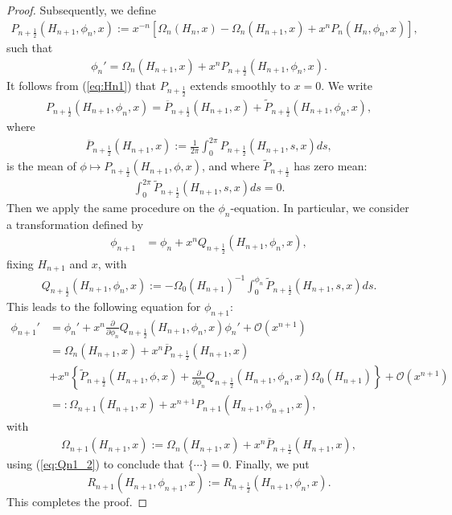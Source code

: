 \documentclass[reqno,12pt]{amsart}
\newcommand{\eqlab}[1]{\label{eq:#1}}
\renewcommand{\eqref}[1]{(\ref{eq:#1})}
\numberwithin{equation}{section}
\begin{document}
\begin{proof}
Subsequently, we define
\begin{align*}
 P_{n+\frac12}(H_{n+1},\phi_n,x):=x^{-n} \left[\Omega_n(H_n,x)-\Omega_n(H_{n+1},x) +x^{n} P_n(H_n,\phi_n,x)\right],
\end{align*}
such that 
\begin{align*}
 \phi_n' = \Omega_n(H_{n+1},x)+x^{n}P_{n+\frac12}(H_{n+1},\phi_n,x).
\end{align*}
 It follows from \eqref{Hn1} that $P_{n+\frac12}$ extends smoothly to $x=0$. We write 
 \begin{align*}
  P_{n+\frac12}(H_{n+1},\phi_n,x)  = \overline P_{n+\frac12}(H_{n+1},x)+\widetilde P_{n+\frac12}(H_{n+1},\phi_n,x),
 \end{align*}
where 
\begin{align*}
\overline P_{n+\frac12}(H_{n+1},x):= \frac{1}{2\pi}\int_0^{2\pi} P_{n+\frac12}(H_{n+1},s,x) ds,
 \end{align*}
 is the mean of $\phi\mapsto P_{n+\frac12}(H_{n+1},\phi,x)$, and where $\widetilde P_{n+\frac12}$ has zero mean:
  \begin{align}
   \int_{0}^{2\pi} \widetilde P_{n+\frac12}(H_{n+1},s,x) ds = 0.\nonumber
  \end{align}
Then we apply the same procedure on the $\phi_n$-equation. In particular, we consider a transformation defined by
\begin{align*}
\phi_{n+1}&=\phi_n+x^{n}  Q_{n+\frac12}(H_{n+1},\phi_n,x),
\end{align*}
fixing $H_{n+1}$ and $x$, 
with
\begin{align}
 Q_{n+\frac12}(H_{n+1},\phi_n,x):=-\Omega_0(H_{n+1})^{-1} \int_{0}^{\phi_n} \widetilde P_{n+\frac12}(H_{n+1},s,x)ds.\eqlab{Qn1_2}
\end{align}
This leads to the following equation for $\phi_{n+1}$:
\begin{align*}
  \phi_{n+1}' &= \phi_n' + x^{n} \frac{\partial }{\partial \phi_n} Q_{n+\frac12}(H_{n+1},\phi_n,x)\phi_n' +\mathcal O(x^{n+1})\\
 &=\Omega_n(H_{n+1},x)+x^{n}\overline P_{n+\frac12}(H_{n+1},x)\\
 &+x^{n}\left\{\widetilde P_{n+\frac12}(H_{n+1},\phi,x)+\frac{\partial }{\partial \phi_n} Q_{n+\frac12}(H_{n+1},\phi_n,x)\Omega_0(H_{n+1})\right\}+\mathcal O(x^{n+1})\\
 &=:\Omega_{n+1}(H_{n+1},x) +x^{n+1} P_{n+1}(H_{n+1},\phi_{n+1},x),
\end{align*}
with
\begin{align*}
 \Omega_{n+1}(H_{n+1},x):=\Omega_n(H_{n+1},x)+x^{n}\overline P_{n+\frac12}(H_{n+1},x),
\end{align*}
using \eqref{Qn1_2} to conclude that $\{\cdots\}=0$. Finally, we put 
$$R_{n+1}(H_{n+1},\phi_{n+1},x):=R_{n+\frac12}(H_{n+1},\phi_n,x).$$ This completes the proof. 
\end{proof}
\end{document}
